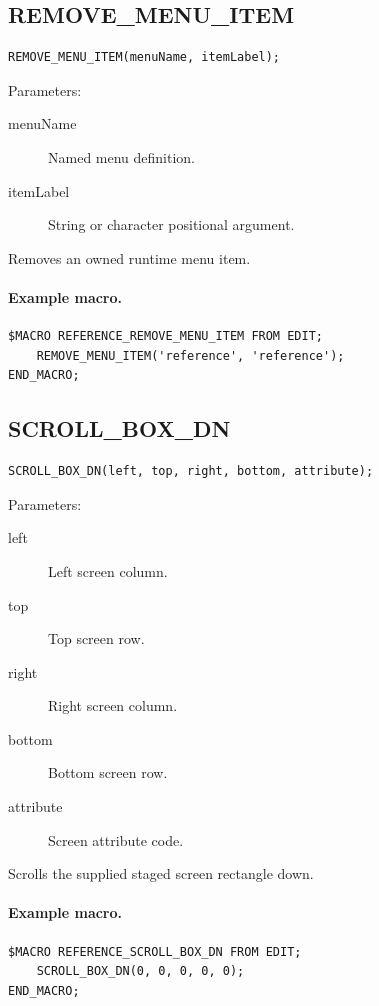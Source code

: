 \documentclass[a4paper,10pt,twoside,openany]{book}
\newenvironment{mrmacextension}{\begin{changebar}}{\end{changebar}}
\begin{document}
\begin{mrmacextension}
\label{prim:procedure-remove-menu-item}
\subsection*{REMOVE\_MENU\_ITEM}
\begin{verbatim}
REMOVE_MENU_ITEM(menuName, itemLabel);
\end{verbatim}
Parameters:
\begin{description}
\item[menuName] Named menu definition.
\item[itemLabel] String or character positional argument.
\end{description}

Removes an owned runtime menu item.

\paragraph{Example macro.}
\begin{verbatim}
$MACRO REFERENCE_REMOVE_MENU_ITEM FROM EDIT;
    REMOVE_MENU_ITEM('reference', 'reference');
END_MACRO;
\end{verbatim}
\end{mrmacextension}

\label{prim:procedure-scroll-box-dn}
\subsection*{SCROLL\_BOX\_DN}
\begin{verbatim}
SCROLL_BOX_DN(left, top, right, bottom, attribute);
\end{verbatim}
Parameters:
\begin{description}
\item[left] Left screen column.
\item[top] Top screen row.
\item[right] Right screen column.
\item[bottom] Bottom screen row.
\item[attribute] Screen attribute code.
\end{description}

Scrolls the supplied staged screen rectangle down.

\paragraph{Example macro.}
\begin{verbatim}
$MACRO REFERENCE_SCROLL_BOX_DN FROM EDIT;
    SCROLL_BOX_DN(0, 0, 0, 0, 0);
END_MACRO;
\end{verbatim}
\end{document}

